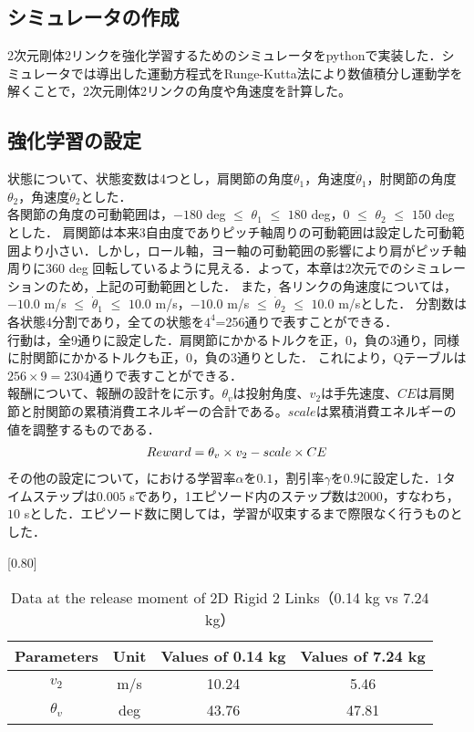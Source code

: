 \begin{small}
\subsection{シミュレータの作成}
2次元剛体2リンクを強化学習するためのシミュレータをpythonで実装した．シミュレータでは導出した運動方程式をRunge-Kutta法\cite{runge-kutta}により数値積分し運動学を解くことで，2次元剛体2リンクの角度や角速度を計算した。
\subsection{強化学習の設定}
状態について、状態変数は4つとし，肩関節の角度$\theta_{1}$，角速度$\dot{\theta}_{1}$，肘関節の角度$\theta_{2}$，角速度$\dot{\theta}_{2}$とした．\\
各関節の角度の可動範囲は，$-180$ deg $\le$ $\theta_{1}$ $\le$ $180$ deg，$0$ $\le$ $\theta_{2}$ $\le$ $150$ deg\cite{range}とした．
肩関節は本来3自由度でありピッチ軸周りの可動範囲は設定した可動範囲より小さい．しかし，ロール軸，ヨー軸の可動範囲の影響により肩がピッチ軸周りに$360$ deg 回転しているように見える．よって，本章は2次元でのシミュレーションのため，上記の可動範囲とした．
また，各リンクの角速度については，$-10.0$ m/s $\le$ $\dot{\theta}_{1}$ $\le$ $10.0$ m/s，$-10.0$ m/s $\le$ $\dot{\theta}_{2}$ $\le$ $10.0$ m/sとした．
分割数は各状態4分割であり，全ての状態を$4^{4}$=256通りで表すことができる．\\
行動は，全9通りに設定した．肩関節にかかるトルクを正，0，負の3通り，同様に肘関節にかかるトルクも正，0，負の3通りとした．
これにより，Qテーブルは$256 \times 9=2304$通りで表すことができる．\\
報酬について、報酬の設計をに示す。$\theta_{v}$は投射角度、$v_{2}$は手先速度、$CE$は肩関節と肘関節の累積消費エネルギーの合計である。$scale$は累積消費エネルギーの値を調整するものである．
\begin{eqnarray}
  \equlabel{9}
  Reward = \theta_{v} \times v_{2} - scale \times CE
\end{eqnarray}
その他の設定について，における学習率$\alpha$を$0.1$，割引率$\gamma$を$0.9$に設定した．1タイムステップは$0.005$ sであり，1エピソード内のステップ数は2000，すなわち，$10$ sとした．エピソード数に関しては，学習が収束するまで際限なく行うものとした．
\begin{table}[t]
  \begin{center}
    \caption{Data at the release moment of 2D Rigid 2 Links（0.14 kg vs 7.24 kg）}
    \scalebox{0.80}[0.80]{
    \begin{tabular}{c|c|c|c}
      \hline
      Parameters & Unit & Values of 0.14 kg & Values of 7.24 kg \\
      \hline
      $v_{2}$ & m/s & 10.24 & 5.46 \\
      $\theta_{v}$ & deg & 43.76 & 47.81 \\
      \hline
    \end{tabular}
    }
  \end{center}
\end{table}

\end{small}
